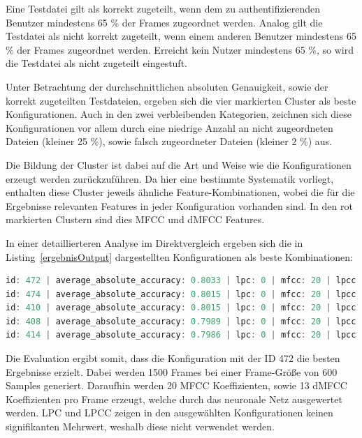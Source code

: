 Eine Testdatei gilt als korrekt zugeteilt, wenn dem zu authentifizierenden Benutzer mindestens 65 \% der Frames zugeordnet werden.
Analog gilt die Testdatei als nicht korrekt zugeteilt, wenn einem anderen Benutzer mindestens 65 \% der Frames zugeordnet werden.
Erreicht kein Nutzer mindestens 65 \%, so wird die Testdatei als nicht zugeteilt eingestuft.

Unter Betrachtung der durchschnittlichen absoluten Genauigkeit, sowie der korrekt zugeteilten Testdateien, ergeben sich die vier markierten Cluster als beste Konfigurationen.
Auch in den zwei verbleibenden Kategorien, zeichnen sich diese Konfigurationen vor allem durch eine niedrige Anzahl an nicht zugeordneten Dateien (kleiner 25 \%), sowie falsch zugeordneter Dateien (kleiner 2 \%) aus.

Die Bildung der Cluster ist dabei auf die Art und Weise wie die Konfigurationen erzeugt werden zurückzuführen.
Da hier eine bestimmte Systematik vorliegt, enthalten diese Cluster jeweils ähnliche Feature-Kombinationen, wobei die für die Ergebnisse relevanten Features in jeder Konfiguration vorhanden sind.
In den rot markierten Clustern sind dies \ac{MFCC} und \ac{dMFCC} Features.

In einer detaillierteren Analyse im Direktvergleich ergeben sich die in Listing~\ref{ergebnisOutput} dargestellten Konfigurationen als beste Kombinationen:
\begin{lstlisting}[language=JavaScript,numbers=none,caption=Auswertung der Konfigurationen,label=ergebnisOutput]
id: 472 | average_absolute_accuracy: 0.8033 | lpc: 0 | mfcc: 20 | lpcc:  0 | delta_mfcc: 13
id: 474 | average_absolute_accuracy: 0.8015 | lpc: 0 | mfcc: 20 | lpcc: 13 | delta_mfcc: 13
id: 410 | average_absolute_accuracy: 0.8015 | lpc: 0 | mfcc: 20 | lpcc: 13 | delta_mfcc: 13
id: 408 | average_absolute_accuracy: 0.7989 | lpc: 0 | mfcc: 20 | lpcc:  0 | delta_mfcc: 13
id: 414 | average_absolute_accuracy: 0.7986 | lpc: 0 | mfcc: 20 | lpcc: 13 | delta_mfcc: 13
\end{lstlisting}

Die Evaluation ergibt somit, dass die Konfiguration mit der ID 472 die besten Ergebnisse erzielt.
Dabei werden 1500 Frames bei einer Frame-Größe von 600 Samples generiert.
Daraufhin werden 20 \ac{MFCC} Koeffizienten, sowie 13 \ac{dMFCC} Koeffizienten pro Frame erzeugt, welche durch das neuronale Netz ausgewertet werden.
\ac{LPC} und \ac{LPCC} zeigen in den ausgewählten Konfigurationen keinen signifikanten Mehrwert, weshalb diese nicht verwendet werden.
